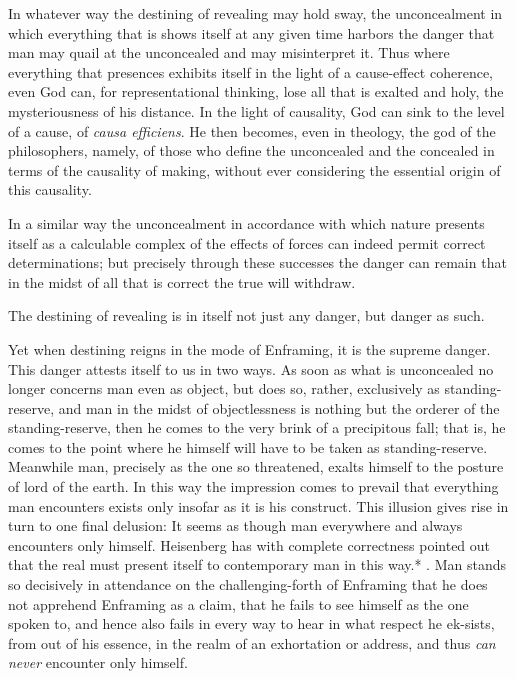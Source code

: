 In whatever way the destining of revealing may hold sway, the unconcealment in which everything that is shows itself at any given time harbors the danger that man may quail at the unconcealed and may misinterpret it. Thus where everything that presences exhibits itself in the light of a cause-effect coherence, even God can, for representational thinking, lose all that is exalted and holy, the mysteriousness of his distance. In the light of causality, God can sink to the level of a cause, of \textit{causa efficiens}. He then becomes, even in theology, the god of the philosophers, namely, of those who define the unconcealed and the concealed in terms of the causality of making, without ever considering the essential origin of this causality.

In a similar way the unconcealment in accordance with which nature presents itself as a calculable complex of the effects of forces can indeed permit correct determinations; but precisely through these successes the danger can remain that in the midst of all that is correct the true will withdraw.

The destining of revealing is in itself not just any danger, but danger as such.

Yet when destining reigns in the mode of Enframing, it is the supreme danger. This danger attests itself to us in two ways. As soon as what is unconcealed no longer concerns man even as object, but does so, rather, exclusively as standing-reserve, and man in the midst of objectlessness is nothing but the orderer of the standing-reserve, then he comes to the very brink of a precipitous fall; that is, he comes to the point where he himself will have to be taken as standing-reserve. Meanwhile man, precisely as the one so threatened, exalts himself to the posture of lord of the earth. In this way the impression comes to prevail that everything man encounters exists only insofar as it is his construct. This illusion gives rise in turn to one final delusion: It seems as though man everywhere and always encounters only himself. Heisenberg has with complete correctness pointed out that the real must present itself to contemporary man in this way.* . Man stands so decisively in attendance on the challenging-forth of Enframing that he does not apprehend Enframing as a claim, that he fails to see himself as the one spoken to, and hence also fails in every way to hear in what respect he ek-sists, from out of his essence, in the realm of an exhortation or address, and thus \textit{can never} encounter only himself.

